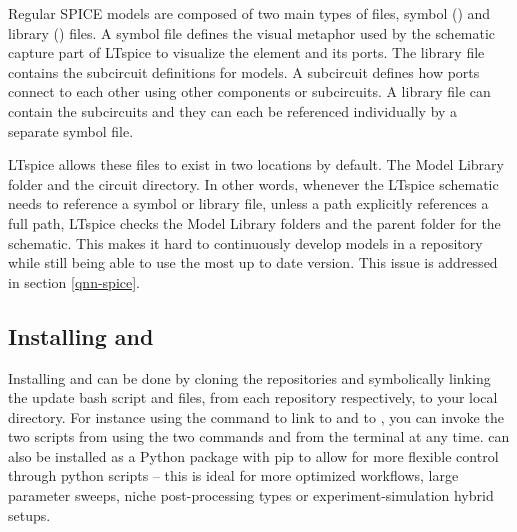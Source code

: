 Regular SPICE models are composed of two main types of files, symbol () and library
() files. A symbol file defines the visual metaphor used by the schematic capture
part of LTspice to visualize the element and its ports. The library file contains the subcircuit
definitions for models. A subcircuit defines how ports connect to each other using other components
or subcircuits. A library file can contain the subcircuits and they can each be referenced individually
by a separate symbol file.

LTspice allows these files to exist in two locations by default. The Model Library folder and the circuit directory. In other words, whenever the LTspice schematic needs to reference a symbol or
library file, unless a path explicitly references a full path, LTspice checks the Model Library folders 
and the parent folder for the schematic. This makes it hard to continuously develop models in a repository
while still being able to use the most up to date version. This issue is addressed in section \ref{qnn-spice}.










\subsection{Installing  and  }

Installing  and  can be done by cloning the repositories
and symbolically linking the update bash script and  files, from each repository
respectively, to your local 
directory. For instance using the  command to link 
to  and  to , you can invoke
the two scripts from using the two commands  and  from the terminal at
any time.
 can also be installed as a Python package with pip to allow for more
flexible control through python scripts -- this is ideal for more optimized workflows,
large parameter sweeps, niche post-processing types or experiment-simulation hybrid
setups.


